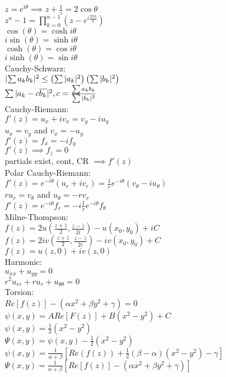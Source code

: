 \documentclass[letterpaper,12pt,fleqn,twocolumn]{article}
\newcommand{\zb}{\bar{z}}
\renewcommand{\o}{\theta}
\newcommand{\g}{\gamma}
\renewcommand{\a}{\alpha}
\renewcommand{\b}{\beta}
\newcommand{\s}{\psi}
\renewcommand{\S}{\Psi}
\begin{document}
$z=e^{i\o}\implies z+\frac{1}{z}=2\cos\o$ \\
$z^n-1=\prod_{k=0}^{n-1}{\left(z-e^{i\frac{2\pi k}{n}}\right)}$ \\
$\cos(\o)=\cosh{i\o}$ \\
$i\sin(\o)=\sinh{i\o}$ \\
$\cosh(\o)=\cos{i\o}$ \\
$i\sinh(\o)=\sin{i\o}$ \\
Cauchy-Schwarz: \\
$\lvert\sum{a_kb_k}\rvert^2\le\left(\sum{\lvert a_k\rvert^2}\right)
\left(\sum{\lvert b_k\rvert^2}\right)$ \\
$\sum{\lvert a_k-c\overline{b_k}\rvert^2}, c=\frac{\sum{a_kb_k}}{\sum{\lvert b_k\rvert^2}}$ \\
Cauchy-Riemann: \\
$f'(z)=u_x+iv_x=v_y-iu_y$ \\
$u_x=v_y$ and $v_x=-u_y$ \\
$f'(z)=f_x=-if_y$ \\
$f'(z)\implies f_{\zb}=0$ \\
partials exist, cont, CR $\implies f'(z)$ \\
Polar Cauchy-Riemann: \\
$f'(z)=e^{-i\o}(u_r+iv_r)=\frac{1}{r}e^{-i\o}(v_{\o}-iu_{\o})$ \\
$ru_r=v_{\o}$ and $u_{\o}=-rv_r$ \\
$f'(z)=e^{-i\o}f_r=-i\frac{1}{r}e^{-i\o}f_{\o}$ \\
Milne-Thompson:\\
$f(z)=2u\left(\frac{z+\bar{z}}{2},\frac{z-\bar{z}}{2i}\right)-u(x_0,y_0)+iC$ \\
$f(z)=2iv\left(\frac{z+\bar{z}}{2},\frac{z-\bar{z}}{2i}\right)-
iv(x_0,y_0)+C$ \\
$f(z)=u(z,0)+iv(z,0)$ \\
Harmonic:\\
$u_{xx}+u_{yy}=0$ \\
$r^2u_{rr}+ru_r+u_{\o\o}=0$ \\
Torsion: \\
$Re[f(z)]-(\a x^2+\b y^2+\g)=0$ \\
$\s(x,y)=A Re[F(z)]+B(x^2-y^2)+C$ \\
$\s(x,y)=\frac{1}{2}(x^2-y^2)$ \\
$\S(x,y)=\s(x,y)-\frac{1}{2}(x^2-y^2)$ \\
$\s(x,y)=\frac{1}{\a+\b}[Re(f(z))+\frac{1}{2}(\b-\a)(x^2-y^2)-\g]$ \\
$\S(x,y)=\frac{1}{\a+\b}[Re[f(z)]-(\a x^2+\b y^2+\g)]$ \\
\end{document}
